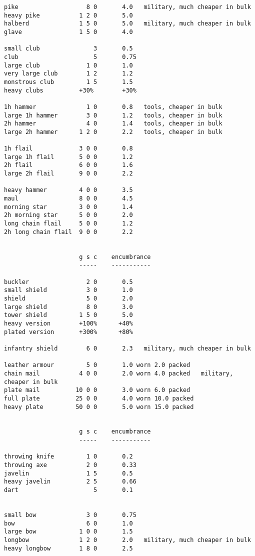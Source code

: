 \begin{verbatim}
pike                   8 0       4.0   military, much cheaper in bulk
heavy pike           1 2 0       5.0
halberd              1 5 0       5.0   military, much cheaper in bulk
glave                1 5 0       4.0

small club               3       0.5
club                     5       0.75
large club             1 0       1.0
very large club        1 2       1.2
monstrous club         1 5       1.5
heavy clubs          +30%        +30%

1h hammer              1 0       0.8   tools, cheaper in bulk
large 1h hammer        3 0       1.2   tools, cheaper in bulk
2h hammer              4 0       1.4   tools, cheaper in bulk
large 2h hammer      1 2 0       2.2   tools, cheaper in bulk

1h flail             3 0 0       0.8
large 1h flail       5 0 0       1.2
2h flail             6 0 0       1.6
large 2h flail       9 0 0       2.2

heavy hammer         4 0 0       3.5
maul                 8 0 0       4.5
morning star         3 0 0       1.4
2h morning star      5 0 0       2.0
long chain flail     5 0 0       1.2
2h long chain flail  9 0 0       2.2


                     g s c    encumbrance
                     -----    -----------

buckler                2 0       0.5
small shield           3 0       1.0
shield                 5 0       2.0
large shield           8 0       3.0
tower shield         1 5 0       5.0
heavy version        +100%      +40%
plated version       +300%      +80%

infantry shield        6 0       2.3   military, much cheaper in bulk

leather armour         5 0       1.0 worn 2.0 packed
chain mail           4 0 0       2.0 worn 4.0 packed   military, cheaper in bulk
plate mail          10 0 0       3.0 worn 6.0 packed
full plate          25 0 0       4.0 worn 10.0 packed
heavy plate         50 0 0       5.0 worn 15.0 packed


                     g s c    encumbrance
                     -----    -----------

throwing knife         1 0       0.2
throwing axe           2 0       0.33
javelin                1 5       0.5
heavy javelin          2 5       0.66
dart                     5       0.1


small bow              3 0       0.75
bow                    6 0       1.0
large bow            1 0 0       1.5
longbow              1 2 0       2.0   military, much cheaper in bulk
heavy longbow        1 8 0       2.5


\end{verbatim}
